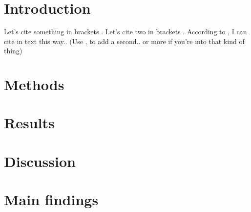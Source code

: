 \section{Introduction}
Let's cite something in brackets \citep{Kearse2012geneious}. Let's cite two in brackets \citep{Kearse2012geneious, Belhaj2013}. According to \citet{weber2011modular}, I can cite in text this way.. (Use , to add a second.. or more if you're into that kind of thing)
\section{Methods}
\lipsum %
\newpage
\section{Results}
\lipsum %
\newpage
\section{Discussion}
\lipsum %
\newpage
\section{Main findings}
\lipsum %